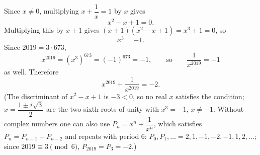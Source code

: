 Since $x\ne0$, multiplying $x+\dfrac{1}{x}=1$ by $x$ gives
\[x^2-x+1=0 .\]
Multiplying this by $x+1$ gives $(x+1)(x^2-x+1)=x^3+1=0$, so
\[x^3=-1 .\]
Since $2019=3\cdot673$,
\[x^{2019}=\left(x^3\right)^{673}=(-1)^{673}=-1,\qquad\text{so}\qquad \dfrac{1}{x^{2019}}=-1\]
as well. Therefore
\[x^{2019}+\dfrac{1}{x^{2019}}=\boxed{-2}.\]
(The discriminant of $x^2-x+1$ is $-3<0$, so no real $x$ satisfies the condition; $x=\dfrac{1\pm i\sqrt3}{2}$ are the two sixth roots of unity with $x^3=-1$, $x\ne-1$. Without complex numbers one can also use $P_n=x^n+\dfrac{1}{x^n}$, which satisfies $P_n=P_{n-1}-P_{n-2}$ and repeats with period $6$: $P_0,P_1,\dots=2,1,-1,-2,-1,1,2,\dots$; since $2019\equiv3\pmod 6$, $P_{2019}=P_3=-2$.)
